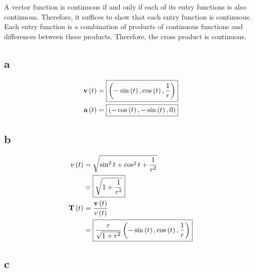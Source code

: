 \documentclass{article}
\begin{document}
A vector function is continuous if and only if each of its entry functions is also continuous.
Therefore, it suffices to show that each entry function is continuous.
Each entry function is a combination of products of continuous functions and differences between these products.
Therefore, the cross product is continuous.


\subsection*{a}

\begin{align*}
  \textbf{v} \left ( t \right) &= \boxed{\left ( - \sin \left ( t \right), \cos \left ( t \right), \frac{1}{r} \right)} \\
  \textbf{a} \left ( t \right) &= \boxed{\left ( - \cos \left ( t \right), - \sin \left ( t \right), 0 \right)} \\
\end{align*}

\subsection*{b}

\begin{align*}
  v \left ( t \right) &= \sqrt{\sin^2 t + \cos^2 t + \frac{1}{r^2}} \\
             &= \boxed{\sqrt{1 + \frac{1}{r^2}}} \\
  \textbf{T} \left ( t \right) &= \frac{\textbf{v} \left ( t \right)}{v \left ( t \right)} \\
             &= \boxed{ \frac{r}{\sqrt{1+r^2}} \left ( - \sin \left ( t \right), \cos \left ( t \right), \frac{1}{r} \right)} \\
\end{align*}

\subsection*{c}
\end{document}
